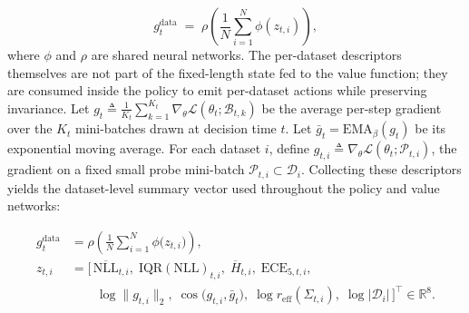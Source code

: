 \documentclass[11pt]{article}
\newcommand{\1}{\mathbf{1}}
\begin{document}
\begin{equation}
g^{\text{data}}_t \;=\; \rho\!\left(\frac{1}{N}\sum_{i=1}^N \phi(z_{t,i})\right),
\label{eq:deepsets-global}
\end{equation}
where $\phi$ and $\rho$ are shared neural networks. The per-dataset descriptors themselves are not part of the fixed-length state fed to the value function; they are consumed inside the policy to emit per-dataset actions while preserving invariance. Let \(g_t \triangleq \frac{1}{K_t}\sum_{k=1}^{K_t} \nabla_\theta \mathcal{L}(\theta_t; \mathcal{B}_{t,k})\) 
be the average per-step gradient over the \(K_t\) mini-batches drawn at decision time \(t\). 
Let \(\bar g_t = \mathrm{EMA}_\beta(g_t)\) be its exponential moving average. 
For each dataset \(i\), define \(g_{t,i} \triangleq \nabla_\theta \mathcal{L}(\theta_t; \mathcal{P}_{t,i})\), 
the gradient on a fixed small probe mini-batch \(\mathcal{P}_{t,i}\subset\mathcal{D}_i\).
Collecting these descriptors yields the dataset-level summary vector used throughout the policy and value networks:

\begin{equation}
\label{eq:gdata-full}
\begin{aligned}
g^{\text{data}}_t
&= \rho\!\left(\frac{1}{N}\sum_{i=1}^N \phi\!\big(z_{t,i}\big)\right),\\[0.25em]
z_{t,i}
&= \Big[\, \overline{\mathrm{NLL}}_{t,i},\; \mathrm{IQR}(\mathrm{NLL})_{t,i},\; \overline{H}_{t,i},\; \mathrm{ECE}_{5,t,i},\\[-0.25em]
&\qquad \log\|g_{t,i}\|_2,\; \cos\!\big(g_{t,i},\bar g_t\big),\; \log r_{\mathrm{eff}}(\Sigma_{t,i}),\; \log|\mathcal D_i| \,\Big]^{\!\top}\!\in\mathbb{R}^{8}.
\end{aligned}
\end{equation}
\end{document}
